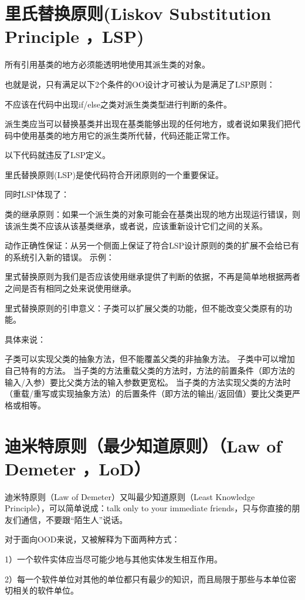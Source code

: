\section{里氏替换原则(Liskov Substitution Principle ，LSP)}
所有引用基类的地方必须能透明地使用其派生类的对象。

也就是说，只有满足以下2个条件的OO设计才可被认为是满足了LSP原则：

不应该在代码中出现if/else之类对派生类类型进行判断的条件。

派生类应当可以替换基类并出现在基类能够出现的任何地方，或者说如果我们把代码中使用基类的地方用它的派生类所代替，代码还能正常工作。

以下代码就违反了LSP定义。


里氏替换原则(LSP)是使代码符合开闭原则的一个重要保证。

同时LSP体现了：

类的继承原则：如果一个派生类的对象可能会在基类出现的地方出现运行错误，则该派生类不应该从该基类继承，或者说，应该重新设计它们之间的关系。

动作正确性保证：从另一个侧面上保证了符合LSP设计原则的类的扩展不会给已有的系统引入新的错误。
示例：

里式替换原则为我们是否应该使用继承提供了判断的依据，不再是简单地根据两者之间是否有相同之处来说使用继承。

里式替换原则的引申意义：子类可以扩展父类的功能，但不能改变父类原有的功能。

具体来说：

子类可以实现父类的抽象方法，但不能覆盖父类的非抽象方法。
子类中可以增加自己特有的方法。
当子类的方法重载父类的方法时，方法的前置条件（即方法的输入/入参）要比父类方法的输入参数更宽松。
当子类的方法实现父类的方法时（重载/重写或实现抽象方法）的后置条件（即方法的输出/返回值）要比父类更严格或相等。

\section{迪米特原则（最少知道原则）（Law of Demeter ，LoD）}

迪米特原则（Law of Demeter）又叫最少知道原则（Least Knowledge Principle），可以简单说成：talk only to your immediate friends，只与你直接的朋友们通信，不要跟“陌生人”说话。

对于面向OOD来说，又被解释为下面两种方式：

1）一个软件实体应当尽可能少地与其他实体发生相互作用。

2）每一个软件单位对其他的单位都只有最少的知识，而且局限于那些与本单位密切相关的软件单位。

